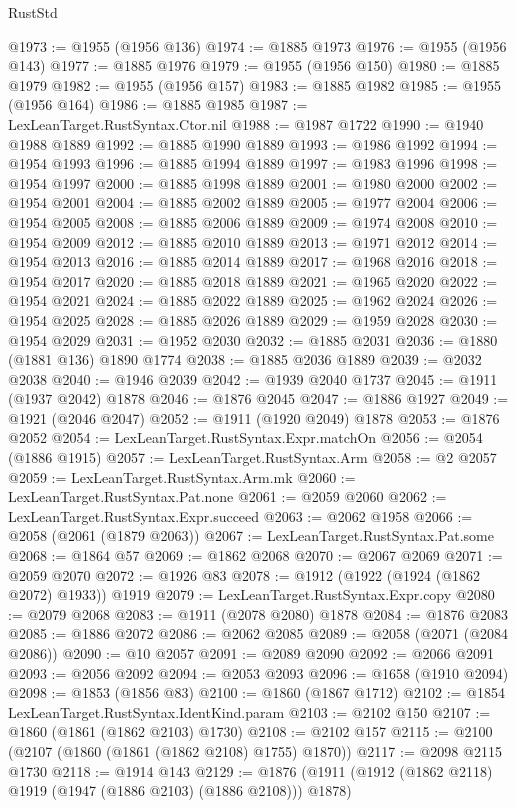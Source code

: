 \begin{lexlean}{RustStd}
\begin{coremodule}
{\begin{coremodule}
{{{{{{{{{{{{{{{{{{{{{{{{{{{{{@1973 := @1955 (@1956 @136)
@1974 := @1885 @1973
@1976 := @1955 (@1956 @143)
@1977 := @1885 @1976
@1979 := @1955 (@1956 @150)
@1980 := @1885 @1979
@1982 := @1955 (@1956 @157)
@1983 := @1885 @1982
@1985 := @1955 (@1956 @164)
@1986 := @1885 @1985
@1987 := LexLeanTarget.RustSyntax.Ctor.nil
@1988 := @1987 @1722
@1990 := @1940 @1988 @1889
@1992 := @1885 @1990 @1889
@1993 := @1986 @1992
@1994 := @1954 @1993
@1996 := @1885 @1994 @1889
@1997 := @1983 @1996
@1998 := @1954 @1997
@2000 := @1885 @1998 @1889
@2001 := @1980 @2000
@2002 := @1954 @2001
@2004 := @1885 @2002 @1889
@2005 := @1977 @2004
@2006 := @1954 @2005
@2008 := @1885 @2006 @1889
@2009 := @1974 @2008
@2010 := @1954 @2009
@2012 := @1885 @2010 @1889
@2013 := @1971 @2012
@2014 := @1954 @2013
@2016 := @1885 @2014 @1889
@2017 := @1968 @2016
@2018 := @1954 @2017
@2020 := @1885 @2018 @1889
@2021 := @1965 @2020
@2022 := @1954 @2021
@2024 := @1885 @2022 @1889
@2025 := @1962 @2024
@2026 := @1954 @2025
@2028 := @1885 @2026 @1889
@2029 := @1959 @2028
@2030 := @1954 @2029
@2031 := @1952 @2030
@2032 := @1885 @2031
@2036 := @1880 (@1881 @136) @1890 @1774
@2038 := @1885 @2036 @1889
@2039 := @2032 @2038
@2040 := @1946 @2039
@2042 := @1939 @2040 @1737
@2045 := @1911 (@1937 @2042) @1878
@2046 := @1876 @2045
@2047 := @1886 @1927
@2049 := @1921 (@2046 @2047)
@2052 := @1911 (@1920 @2049) @1878
@2053 := @1876 @2052
@2054 := LexLeanTarget.RustSyntax.Expr.matchOn
@2056 := @2054 (@1886 @1915)
@2057 := LexLeanTarget.RustSyntax.Arm
@2058 := @2 @2057
@2059 := LexLeanTarget.RustSyntax.Arm.mk
@2060 := LexLeanTarget.RustSyntax.Pat.none
@2061 := @2059 @2060
@2062 := LexLeanTarget.RustSyntax.Expr.succeed
@2063 := @2062 @1958
@2066 := @2058 (@2061 (@1879 @2063))
@2067 := LexLeanTarget.RustSyntax.Pat.some
@2068 := @1864 @57
@2069 := @1862 @2068
@2070 := @2067 @2069
@2071 := @2059 @2070
@2072 := @1926 @83
@2078 := @1912 (@1922 (@1924 (@1862 @2072) @1933)) @1919
@2079 := LexLeanTarget.RustSyntax.Expr.copy
@2080 := @2079 @2068
@2083 := @1911 (@2078 @2080) @1878
@2084 := @1876 @2083
@2085 := @1886 @2072
@2086 := @2062 @2085
@2089 := @2058 (@2071 (@2084 @2086))
@2090 := @10 @2057
@2091 := @2089 @2090
@2092 := @2066 @2091
@2093 := @2056 @2092
@2094 := @2053 @2093
@2096 := @1658 (@1910 @2094)
@2098 := @1853 (@1856 @83)
@2100 := @1860 (@1867 @1712)
@2102 := @1854 LexLeanTarget.RustSyntax.IdentKind.param
@2103 := @2102 @150
@2107 := @1860 (@1861 (@1862 @2103) @1730)
@2108 := @2102 @157
@2115 := @2100 (@2107 (@1860 (@1861 (@1862 @2108) @1755) @1870))
@2117 := @2098 @2115 @1730
@2118 := @1914 @143
@2129 := @1876 (@1911 (@1912 (@1862 @2118) @1919 (@1947 (@1886 @2103) (@1886 @2108))) @1878)
}}}}}}}}}}}}}}}}}}}}}}}}}}}}}
\end{coremodule}}
\end{coremodule}
\end{lexlean}
